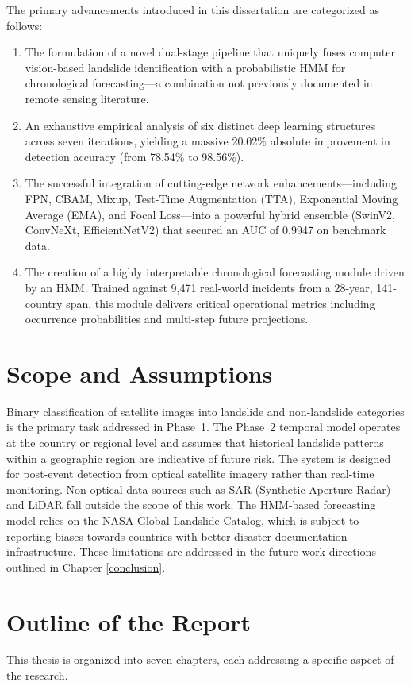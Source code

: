 \documentclass[12pt,a4paper]{report}
\begin{document}
The primary advancements introduced in this dissertation are categorized as follows:

\begin{enumerate}
    \item The formulation of a novel dual-stage pipeline that uniquely fuses computer vision-based landslide identification with a probabilistic HMM for chronological forecasting—a combination not previously documented in remote sensing literature.
    \item An exhaustive empirical analysis of six distinct deep learning structures across seven iterations, yielding a massive 20.02\% absolute improvement in detection accuracy (from 78.54\% to 98.56\%).
    \item The successful integration of cutting-edge network enhancements—including FPN, CBAM, Mixup, Test-Time Augmentation (TTA), Exponential Moving Average (EMA), and Focal Loss—into a powerful hybrid ensemble (SwinV2, ConvNeXt, EfficientNetV2) that secured an AUC of 0.9947 on benchmark data.
    \item The creation of a highly interpretable chronological forecasting module driven by an HMM. Trained against 9,471 real-world incidents from a 28-year, 141-country span, this module delivers critical operational metrics including occurrence probabilities and multi-step future projections.
\end{enumerate}

\section{Scope and Assumptions}
Binary classification of satellite images into landslide and non-landslide categories is the primary task addressed in Phase~1. The Phase~2 temporal model operates at the country or regional level and assumes that historical landslide patterns within a geographic region are indicative of future risk. The system is designed for post-event detection from optical satellite imagery rather than real-time monitoring. Non-optical data sources such as SAR (Synthetic Aperture Radar) and LiDAR fall outside the scope of this work. The HMM-based forecasting model relies on the NASA Global Landslide Catalog, which is subject to reporting biases towards countries with better disaster documentation infrastructure. These limitations are addressed in the future work directions outlined in Chapter \ref{conclusion}.

\section{Outline of the Report}
This thesis is organized into seven chapters, each addressing a specific aspect of the research.
\end{document}
